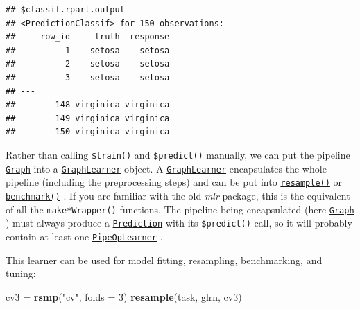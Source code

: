 \documentclass[]{article}
\newenvironment{Shaded}{\begin{snugshade}}{\end{snugshade}}
\newcommand{\DataTypeTok}[1]{\textcolor[rgb]{0.13,0.29,0.53}{#1}}
\newcommand{\DecValTok}[1]{\textcolor[rgb]{0.00,0.00,0.81}{#1}}
\newcommand{\KeywordTok}[1]{\textcolor[rgb]{0.13,0.29,0.53}{\textbf{#1}}}
\newcommand{\NormalTok}[1]{#1}
\newcommand{\OperatorTok}[1]{\textcolor[rgb]{0.81,0.36,0.00}{\textbf{#1}}}
\newcommand{\StringTok}[1]{\textcolor[rgb]{0.31,0.60,0.02}{#1}}
\renewenvironment{Shaded} {\begin{snugshade}\small} {\end{snugshade}}
\begin{document}
\begin{Shaded}
\end{Shaded}

\begin{verbatim}
## $classif.rpart.output
## <PredictionClassif> for 150 observations:
##     row_id     truth  response
##          1    setosa    setosa
##          2    setosa    setosa
##          3    setosa    setosa
## ---                           
##        148 virginica virginica
##        149 virginica virginica
##        150 virginica virginica
\end{verbatim}

Rather than calling \texttt{\$train()} and \texttt{\$predict()} manually, we can put the pipeline \href{https://mlr3pipelines.mlr-org.com/reference/Graph.html}{\texttt{Graph}} into a \href{https://mlr3pipelines.mlr-org.com/reference/mlr_learners_graph.html}{\texttt{GraphLearner}} object.
A \href{https://mlr3pipelines.mlr-org.com/reference/mlr_learners_graph.html}{\texttt{GraphLearner}} encapsulates the whole pipeline (including the preprocessing steps) and can be put into \href{https://mlr3.mlr-org.com/reference/resample.html}{\texttt{resample()}} or \href{https://mlr3.mlr-org.com/reference/benchmark.html}{\texttt{benchmark()}} .
If you are familiar with the old \emph{mlr} package, this is the equivalent of all the \texttt{make*Wrapper()} functions.
The pipeline being encapsulated (here \href{https://mlr3pipelines.mlr-org.com/reference/Graph.html}{\texttt{Graph}} ) must always produce a \href{https://mlr3.mlr-org.com/reference/Prediction.html}{\texttt{Prediction}} with its \texttt{\$predict()} call, so it will probably contain at least one \href{https://mlr3pipelines.mlr-org.com/reference/mlr_pipeops_learner.html}{\texttt{PipeOpLearner}} .

\begin{Shaded}
\end{Shaded}

This learner can be used for model fitting, resampling, benchmarking, and tuning:

\begin{Shaded}
\begin{Highlighting}[]
\NormalTok{cv3 =}\StringTok{ }\KeywordTok{rsmp}\NormalTok{(}\StringTok{"cv"}\NormalTok{, }\DataTypeTok{folds =} \DecValTok{3}\NormalTok{)}
\KeywordTok{resample}\NormalTok{(task, glrn, cv3)}
\end{Highlighting}
\end{Shaded}
\end{document}
